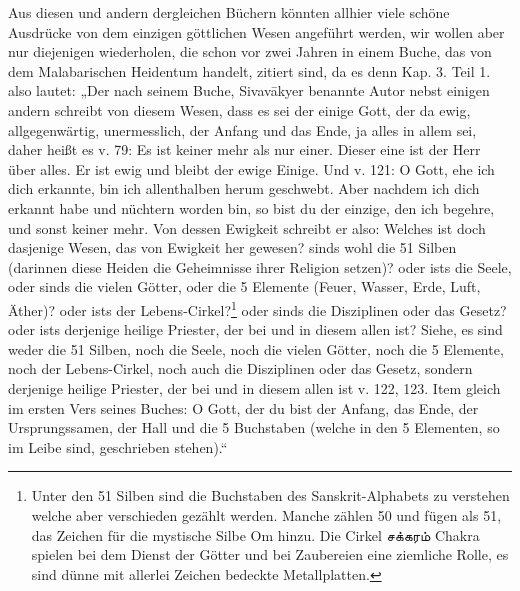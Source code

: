 \documentclass{article}
\newcommand{\TamilText}[1]{\texttamil{#1}}
\newcommand{\tam}[1]{\TamilText{#1}}
\begin{document}
Aus diesen und andern dergleichen Büchern könnten allhier viele schöne Ausdrücke von dem einzigen göttlichen Wesen angeführt werden, wir wollen aber nur diejenigen wiederholen, die schon vor zwei Jahren in einem Buche, das von dem Malabarischen Heidentum handelt, zitiert sind, da es denn Kap. 3. Teil 1. also lautet: „Der nach seinem Buche, Sivav\={a}kyer benannte Autor nebst einigen andern schreibt von diesem Wesen, dass es sei der einige Gott, der da ewig, allgegenwärtig, unermesslich, der Anfang und das Ende, ja alles in allem sei, daher heißt es v. 79: Es ist keiner mehr als nur einer. Dieser eine ist der Herr über alles. Er ist ewig und bleibt der ewige Einige. Und v. 121: O Gott, ehe ich dich erkannte, bin ich allenthalben herum geschwebt. Aber nachdem ich dich erkannt habe und nüchtern worden bin, so bist du der einzige, den ich begehre, und sonst keiner mehr. Von dessen Ewigkeit schreibt er also: Welches ist doch dasjenige Wesen, das von Ewigkeit her gewesen? sinds wohl die 51 Silben (darinnen diese Heiden die Geheimnisse ihrer Religion setzen)? oder ists die Seele, oder sinds die vielen Götter, oder die 5 Elemente (Feuer, Wasser, Erde, Luft, Äther)? oder ists der Lebens-Cirkel?\footnote{Unter den 51 Silben sind die Buchstaben des Sanskrit-Alphabets zu verstehen welche aber verschieden gezählt werden. Manche zählen 50 und fügen als 51, das Zeichen für die mystische Silbe Om hinzu. Die Cirkel \tam{சக்கரம்} Chakra spielen bei dem Dienst der Götter und bei Zaubereien eine ziemliche Rolle, es sind dünne mit allerlei Zeichen bedeckte Metallplatten.} oder sinds die Disziplinen oder das Gesetz? oder ists derjenige heilige Priester, der bei und in diesem allen ist? Siehe, es sind weder die 51 Silben, noch die Seele, noch die vielen Götter, noch die 5 Elemente, noch der Lebens-Cirkel, noch auch die Disziplinen oder das Gesetz, sondern derjenige heilige Priester, der bei und in diesem allen ist v. 122, 123. Item gleich im ersten Vers seines Buches: O Gott, der du bist der Anfang, das Ende, der Ursprungssamen, der Hall und die 5 Buchstaben (welche in den 5 Elementen, so im Leibe sind, geschrieben stehen).“
\end{document}
